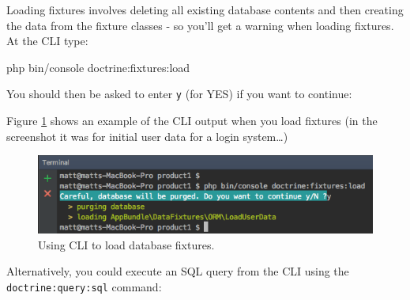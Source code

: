 \documentclass[a4paperpaper,openright]{book}
\newenvironment{Shaded}{}{}
\newcommand{\ExtensionTok}[1]{#1}
\newcommand{\NormalTok}[1]{#1}
\newcommand{\OperatorTok}[1]{\textcolor[rgb]{0.40,0.40,0.40}{#1}}
\begin{document}
Loading fixtures involves deleting all existing database contents and
then creating the data from the fixture classes - so you'll get a
warning when loading fixtures. At the CLI type:

\begin{Shaded}
\begin{Highlighting}[]
    \ExtensionTok{php}\NormalTok{ bin/console doctrine:fixtures:load}
\end{Highlighting}
\end{Shaded}

You should then be asked to enter \texttt{y} (for YES) if you want to
continue:

\begin{Shaded}
\end{Shaded}

Figure \ref{load_fixtures} shows an example of the CLI output when you
load fixtures (in the screenshot it was for initial user data for a
login system\ldots{})

\begin{figure}
\centering
\includegraphics{./tex2pdf.-65f13e14688ab55b/037fd755ae5f5ab98381734496109ca96f310c3a.png}
\caption{Using CLI to load database fixtures. \label{load_fixtures}}
\end{figure}

Alternatively, you could execute an SQL query from the CLI using the
\texttt{doctrine:query:sql} command:
\end{document}
